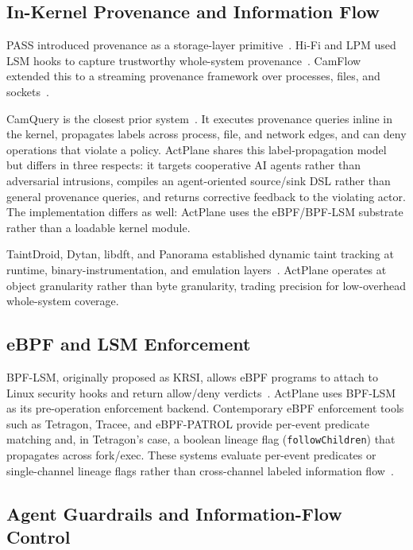 \subsection{In-Kernel Provenance and Information Flow}

PASS introduced provenance as a storage-layer
primitive~\cite{muniswamy2006pass}. Hi-Fi and LPM used LSM hooks to capture
trustworthy whole-system provenance~\cite{pohly2012hifi,bates2015lpm}.
CamFlow extended this to a streaming provenance framework over processes,
files, and sockets~\cite{pasquier2017camflow}.

CamQuery is the closest prior
system~\cite{pasquier2018camquery}. It executes provenance queries inline
in the kernel, propagates labels across process, file, and network edges,
and can deny operations that violate a policy. ActPlane shares this
label-propagation model but differs in three respects: it targets
cooperative AI agents rather than adversarial intrusions, compiles an
agent-oriented source/sink DSL rather than general provenance queries, and
returns corrective feedback to the violating actor. The implementation
differs as well: ActPlane uses the eBPF/BPF-LSM substrate rather than a
loadable kernel module.

TaintDroid, Dytan, libdft, and Panorama established dynamic taint tracking
at runtime, binary-instrumentation, and emulation
layers~\cite{enck2010taintdroid,clause2007dytan,kemerlis2012libdft,yin2007panorama}.
ActPlane operates at object granularity rather than byte granularity,
trading precision for low-overhead whole-system coverage.

\subsection{eBPF and LSM Enforcement}

BPF-LSM, originally proposed as KRSI, allows eBPF programs to attach to
Linux security hooks and return allow/deny
verdicts~\cite{singh2019krsi,linuxbpflsm}. ActPlane uses BPF-LSM as its
pre-operation enforcement backend. Contemporary eBPF enforcement tools
such as Tetragon, Tracee, and eBPF-PATROL provide per-event predicate
matching and, in Tetragon's case, a boolean lineage flag
(\texttt{followChildren}) that propagates across fork/exec. These systems
evaluate per-event predicates or single-channel lineage flags rather than
cross-channel labeled information
flow~\cite{ciliumtetragon,aquasecuritytracee,ghimire2025ebpfpatrol}.

\subsection{Agent Guardrails and Information-Flow Control}

